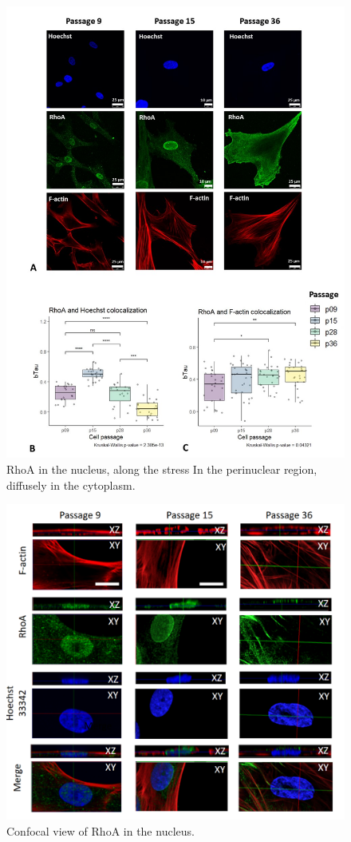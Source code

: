 \documentclass[alpha-refs]{wiley-article}
\begin{document}
\begin{figure}[hbt!]
  \includegraphics[width=0.9\linewidth]{rho.jpg}
  \caption{RhoA in the nucleus, along the stress In the perinuclear region, diffusely in the cytoplasm.}
  \centering
\end{figure}

\begin{figure}[hbt!]
  \includegraphics[width=0.9\linewidth]{rho-3d.png}
  \caption{Confocal view of RhoA in the nucleus.}
  \centering
\end{figure}
\end{document}
